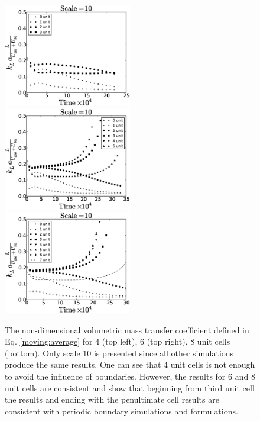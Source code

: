 \documentclass{article}
\begin{document}
\begin{figure}[htb!]
\includegraphics[width=0.5\textwidth]{Figures/aver_moving_window4scale10.eps}
\includegraphics[width=0.5\textwidth]{Figures/aver_moving_window6scale10.eps}\\
\includegraphics[width=0.5\textwidth]{Figures/aver_moving_window8scale10.eps}
\caption{The non-dimensional volumetric mass transfer coefficient defined in Eq.
\ref{moving:average} for $4$ (top left), $6$ (top right), $8$ unit cells (bottom). Only scale
$10$ is presented since all other simulations produce the same results. One can see that $4$ unit
cells is not enough to avoid the influence of boundaries. However, the results for $6$ and $8$
unit cells are consistent and show that beginning from third unit cell the results and ending with
the penultimate cell results are consistent with periodic boundary simulations and
\citet{vanbaten-circular} formulations.
\label{fig:moving:average:ca0097}}
\end{figure}
\end{document}
